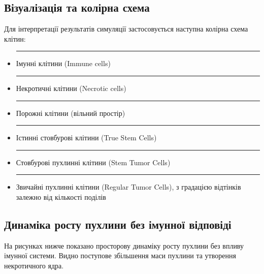 \documentclass{article}
\begin{document}
\subsection{Візуалізація та колірна схема}

Для інтерпретації результатів симуляції застосовується наступна колірна схема клітин:

\begin{itemize}
    \item \textcolor{blue}{\rule{1em}{1em}} Імунні клітини (Immune cells)
    \item \textcolor{orange}{\rule{1em}{1em}} Некротичні клітини (Necrotic cells)
    \item \textcolor{gray}{\rule{1em}{1em}} Порожні клітини (вільний простір)
    \item \textcolor{yellow}{\rule{1em}{1em}} Істинні стовбурові клітини (True Stem Cells)
    \item \textcolor{green}{\rule{1em}{1em}} Стовбурові пухлинні клітини (Stem Tumor Cells)
    \item \textcolor{red}{\rule{1em}{1em}} Звичайні пухлинні клітини (Regular Tumor Cells), з градацією відтінків залежно від кількості поділів
\end{itemize}

\subsection{Динаміка росту пухлини без імунної відповіді}
На рисунках нижче показано просторову динаміку росту пухлини без впливу імунної системи. Видно поступове збільшення маси пухлини та утворення некротичного ядра.
\end{document}
